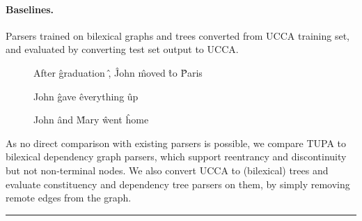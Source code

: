 \documentclass[a0,portrait]{a0poster}
\begin{document}
\begin{multicols}{2}
\paragraph{Baselines.}
Parsers trained on bilexical graphs and trees converted from UCCA training set,
and evaluated by converting test set output to UCCA.

\begin{figure}
	\vspace{-5cm}
	\centering
	\begin{dependency}[theme = simple]
	\begin{deptext}[column sep=.7em,ampersand replacement=\^]
	After \^ graduation \^ , \^ John \^ moved \^ to \^ Paris \\
	\end{deptext}
	\end{dependency}
	\begin{dependency}[theme = simple]
	\begin{deptext}[column sep=.7em,ampersand replacement=\^]
	John \^ gave \^ everything \^ up \\
	\end{deptext}
	\end{dependency}
	\begin{dependency}[theme = simple]
	\begin{deptext}[column sep=.7em,ampersand replacement=\^]
	John \^ and \^ Mary \^ went \^ home \\
	\end{deptext}
	\end{dependency}
\end{figure}

\vspace{5cm}

As no direct comparison with existing parsers is possible,
we compare TUPA{} to bilexical dependency graph parsers,
which support reentrancy and discontinuity but not non-terminal nodes.
We also convert UCCA to (bilexical) trees
and evaluate constituency and dependency tree parsers on them,
by simply removing remote edges from the graph.


\rule{\columnwidth}{1pt}




\end{multicols}
\end{document}
